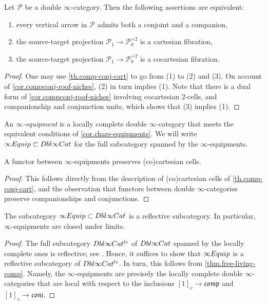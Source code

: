 \documentclass[a4paper, 11pt]{amsart}
\numberwithin{theorem}{section}
\theoremstyle{definition}
\newcommand{\cat}[1]{\textup{#1}}
\renewcommand{\P}{\mathscr{P}}
\newcommand{\DbliCat}{\cat{Dbl}\infty\cat{Cat}}
\newcommand{\Equip}{\cat{Equip}}
\newcommand{\conj}{\mathfrak{conj}}
\newcommand{\comp}{\mathfrak{comp}}
\begin{document}
\begin{corollary}\label{cor.chars-equipments}
	Let $\P$ be a double $\infty$-category. Then the following assertions are equivalent: 
	\begin{enumerate}[noitemsep]
		\item every vertical arrow in $\P$ admits both a conjoint and a companion,
		\item the source-target projection $\P_1 \rightarrow \P_0^{\times 2}$ is a cartesian fibration,
		\item the source-target projection $\P_1 \rightarrow \P_0^{\times 2}$ is a cocartesian fibration.
	\end{enumerate}
	\end{corollary}
\begin{proof}
	One may use \cref{th.comp-conj-cart} to go from (1) to (2) and (3). On account of \cref{cor.compconj-roof-niches}, (2) in turn implies (1). Note that there is a dual form of \cref{cor.compconj-roof-niches} involving cocartesian 2-cells, and companionship and conjunction units, 
	which shows that (3) implies (1).
\end{proof}
	
	\begin{definition}\label{def.equipment}
		An \textit{$\infty$-equipment} is a locally complete double $\infty$-category that meets 
		the equivalent conditions of \cref{cor.chars-equipments}.
		We will write $\infty\Equip \subset \DbliCat$ for the full subcategory spanned by the $\infty$-equipments.
	\end{definition}
	
	\begin{proposition}\label{prop.dbl-fun-pres-cart}
		A functor between $\infty$-equipments preserves (co)car\-tesian cells.
	\end{proposition}
	\begin{proof}
		This follows directly from the description of (co)cartesian cells of \cref{th.comp-conj-cart}, and the observation 
		that functors between double $\infty$-catego\-ries preserve companionships and conjunctions.
	\end{proof}
	
	\begin{proposition}\label{prop.equips-reflective}
		The subcategory $\infty\Equip \subset \DbliCat$ is a reflective subcategory. In particular, 
		$\infty$-equipments are closed under limits.
	\end{proposition}
	\begin{proof}
		The full subcategory $\DbliCat^{lc}$ of $\DbliCat$ spanned by the locally complete ones is reflective; see \cite[Section 3.4]{Comp}. 
		Hence, it suffices to show that 
		$\infty\Equip$ is a reflective subcategory of $\DbliCat^{lc}$. In turn, this follows from \cref{thm.free-living-comp}.
		Namely, the
		$\infty$-equipments are precisely the locally complete double $\infty$-categories that are local with respect to the inclusions 
		$[1]_v \rightarrow \comp$ and $[1]_v \rightarrow \conj$.
	\end{proof}
\end{document}
